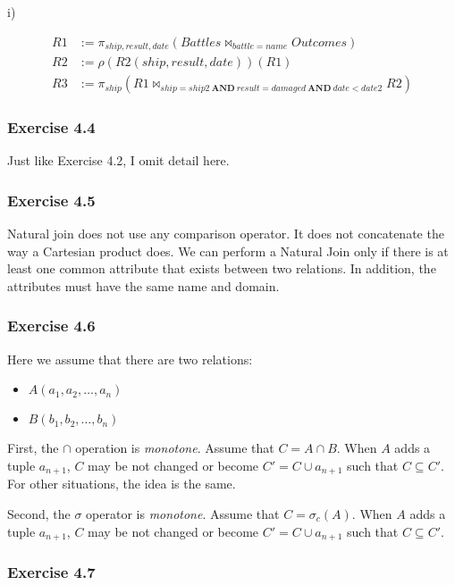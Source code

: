 \documentclass[../../main.tex]{subfiles}
\begin{document}
i)

\begin{align*}
  R1 &:= \pi_{ship, result, date}(Battles
         \bowtie_{battle = name} Outcomes) \\
  R2 &:= \rho(R2(ship, result, date))(R1) \\
  R3 &:= \pi_{ship}(R1 \bowtie_{ship = ship2 \ \mathbf{AND} \
         result = damaged \ \mathbf{AND} \ date < date2} R2)
\end{align*}

\subsubsection*{Exercise 4.4}

Just like Exercise 4.2, I omit detail here.

\subsubsection*{Exercise 4.5}

Natural join does not use any comparison operator. It
does not concatenate the way a Cartesian product does.
We can perform a Natural Join only if there is at least
one common attribute that exists between two relations.
In addition, the attributes must have the same name and
domain.

\subsubsection*{Exercise 4.6}

Here we assume that there are two relations:

\begin{itemize}
  \item $A(a_{1},a_{2},\dots,a_{n})$
  \item $B(b_{1},b_{2},\dots,b_{n})$
\end{itemize}

First, the $\cap$ operation is \emph{monotone}. Assume that
$C = A \cap B$. When $A$ adds a tuple $a_{n + 1}$, $C$ may
be not changed or become $C' = C \cup a_{n + 1}$ such that
$C \subseteq C'$. For other situations, the idea is the same.

Second, the $\sigma$ operator is \emph{monotone}. Assume that
$C = \sigma_{c}(A)$. When $A$ adds a tuple $a_{n + 1}$, $C$ may
be not changed or become $C' = C \cup a_{n + 1}$ such that
$C \subseteq C'$.

\subsubsection*{Exercise 4.7}
\end{document}
